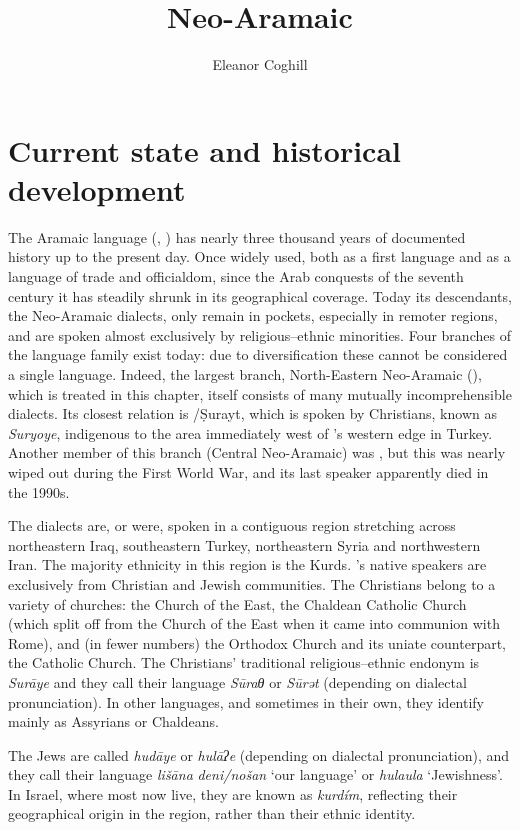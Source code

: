 \documentclass[output=paper]{langsci/langscibook}
\author{Eleanor Coghill\affiliation{Uppsala University}}
\title{Neo-Aramaic}
\begin{document}
\section{Current state and historical development}

The Aramaic language (, ) has nearly three thousand years of documented history up to the present day. Once widely used, both as a first language and as a language of trade and officialdom, since the Arab conquests of the seventh century it has steadily shrunk in its geographical coverage. Today its descendants, the Neo-Aramaic dialects, only remain in pockets, especially in remoter regions, and are spoken almost exclusively by religious–ethnic minorities. Four branches of the language family exist today: due to diversification these cannot be considered a single language. Indeed, the largest branch, North-{Eastern} Neo-Aramaic (), which is treated in this chapter, itself consists of many mutually incomprehensible dialects. Its closest relation is /{Ṣurayt}, which is spoken by {Christians}, known as \textit{Suryoye}, indigenous to the area immediately west of ’s western edge in Turkey. Another member of this branch ({Central} Neo-Aramaic) was , but this was nearly wiped out during the First World War, and its last speaker apparently died in the 1990s. 

The  dialects are, or were, spoken in a contiguous region stretching across northeastern Iraq, southeastern Turkey, northeastern Syria and northwestern Iran. The majority ethnicity in this region is the {Kurds}. ’s native speakers are exclusively from Christian and Jewish communities. The {Christians} belong to a variety of churches: the Church of the East, the Chaldean Catholic Church (which split off from the Church of the East when it came into communion with Rome), and (in fewer numbers) the  Orthodox Church and its uniate counterpart, the  Catholic Church. The {Christians}’ traditional religious–ethnic endonym is \textit{Surāye} and they call their language \textit{Sūraθ} or \textit{Sūrət} (depending on dialectal pronunciation). In other languages, and sometimes in their own, they identify mainly as Assyrians or Chaldeans.

The {Jews} are called \textit{hudāye} or \textit{hulāʔe} (depending on dialectal pronunciation), and they call their language \textit{lišāna} \textit{deni/nošan} ‘our language’ or \textit{hulaula} ‘Jewishness’. In Israel, where most now live, they are known as \textit{kurdím}, reflecting their geographical origin in the  region, rather than their ethnic {identity}.
\end{document}
